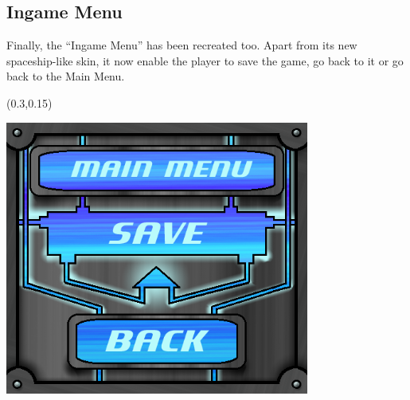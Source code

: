\documentclass[article]{report}         %
\begin{document}
    \newpage
		\subsection{Ingame Menu}
    Finally, the ``Ingame Menu'' has been recreated too. Apart from its new spaceship-like skin, it now enable the player to save the game, go back to it or go back to the Main Menu.\\

    \begin{textblock}{0.6}(0.3,0.15)
    
    \includegraphics[width=10cm, height=9cm]{images/Menus/ingame_menu_normal.png}
    
    \end{textblock}

      ~\\~\\~\\~\\~\\~\\~\\~\\~\\~\\~\\~\\~\\~\\~\\~\\~\\~\\~\\~\\~\\~\\~\\~\\
\end{document}

